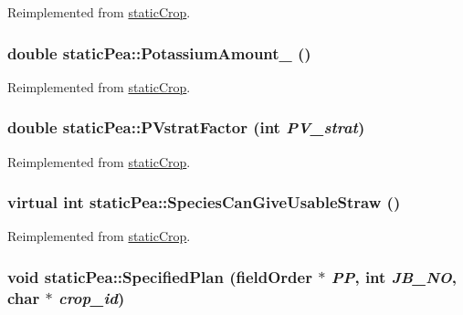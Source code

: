 Reimplemented from \hyperlink{classstatic_crop_abaa5c59d4074d47dedc79172f8326e08}{staticCrop}.\hypertarget{classstatic_pea_a6e42e1210858f6b85749979418a4c0ad}{
\subsubsection[{PotassiumAmount\_\-}]{\setlength{\rightskip}{0pt plus 5cm}double staticPea::PotassiumAmount\_\- ()}}
\label{classstatic_pea_a6e42e1210858f6b85749979418a4c0ad}


Reimplemented from \hyperlink{classstatic_crop_a41fee98d728c7670e6acb504a9b3459d}{staticCrop}.\hypertarget{classstatic_pea_adaf16829a2d0bece8f22018377a89fd9}{
\subsubsection[{PVstratFactor}]{\setlength{\rightskip}{0pt plus 5cm}double staticPea::PVstratFactor (int {\em PV\_\-strat})}}
\label{classstatic_pea_adaf16829a2d0bece8f22018377a89fd9}


Reimplemented from \hyperlink{classstatic_crop_ae4f07498c1616eab212386faf352d348}{staticCrop}.\hypertarget{classstatic_pea_a368cb5d2d6f10edb9d8aecde2e2d7b9b}{
\subsubsection[{SpeciesCanGiveUsableStraw}]{\setlength{\rightskip}{0pt plus 5cm}virtual int staticPea::SpeciesCanGiveUsableStraw ()}}
\label{classstatic_pea_a368cb5d2d6f10edb9d8aecde2e2d7b9b}


Reimplemented from \hyperlink{classstatic_crop_ab7763e4e6a0b9eff1788cb86ebad8170}{staticCrop}.\hypertarget{classstatic_pea_aa4d8917d0c11523a65c5abd929a9bd7c}{
\subsubsection[{SpecifiedPlan}]{\setlength{\rightskip}{0pt plus 5cm}void staticPea::SpecifiedPlan ({\bf fieldOrder} $\ast$ {\em PP}, \/  int {\em JB\_\-NO}, \/  char $\ast$ {\em crop\_\-id})}}
\label{classstatic_pea_aa4d8917d0c11523a65c5abd929a9bd7c}


